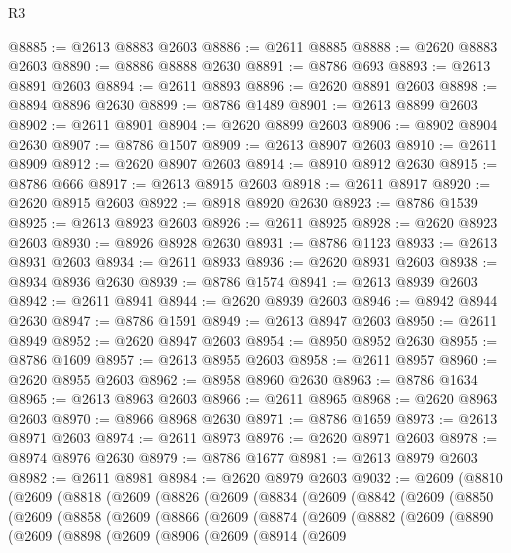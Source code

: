 \begin{lexlean}{R3}
\begin{coremodule}
@8885 := @2613 @8883 @2603
@8886 := @2611 @8885
@8888 := @2620 @8883 @2603
@8890 := @8886 @8888 @2630
@8891 := @8786 @693
@8893 := @2613 @8891 @2603
@8894 := @2611 @8893
@8896 := @2620 @8891 @2603
@8898 := @8894 @8896 @2630
@8899 := @8786 @1489
@8901 := @2613 @8899 @2603
@8902 := @2611 @8901
@8904 := @2620 @8899 @2603
@8906 := @8902 @8904 @2630
@8907 := @8786 @1507
@8909 := @2613 @8907 @2603
@8910 := @2611 @8909
@8912 := @2620 @8907 @2603
@8914 := @8910 @8912 @2630
@8915 := @8786 @666
@8917 := @2613 @8915 @2603
@8918 := @2611 @8917
@8920 := @2620 @8915 @2603
@8922 := @8918 @8920 @2630
@8923 := @8786 @1539
@8925 := @2613 @8923 @2603
@8926 := @2611 @8925
@8928 := @2620 @8923 @2603
@8930 := @8926 @8928 @2630
@8931 := @8786 @1123
@8933 := @2613 @8931 @2603
@8934 := @2611 @8933
@8936 := @2620 @8931 @2603
@8938 := @8934 @8936 @2630
@8939 := @8786 @1574
@8941 := @2613 @8939 @2603
@8942 := @2611 @8941
@8944 := @2620 @8939 @2603
@8946 := @8942 @8944 @2630
@8947 := @8786 @1591
@8949 := @2613 @8947 @2603
@8950 := @2611 @8949
@8952 := @2620 @8947 @2603
@8954 := @8950 @8952 @2630
@8955 := @8786 @1609
@8957 := @2613 @8955 @2603
@8958 := @2611 @8957
@8960 := @2620 @8955 @2603
@8962 := @8958 @8960 @2630
@8963 := @8786 @1634
@8965 := @2613 @8963 @2603
@8966 := @2611 @8965
@8968 := @2620 @8963 @2603
@8970 := @8966 @8968 @2630
@8971 := @8786 @1659
@8973 := @2613 @8971 @2603
@8974 := @2611 @8973
@8976 := @2620 @8971 @2603
@8978 := @8974 @8976 @2630
@8979 := @8786 @1677
@8981 := @2613 @8979 @2603
@8982 := @2611 @8981
@8984 := @2620 @8979 @2603
@9032 := @2609
    (@8810
      (@2609
        (@8818
          (@2609
            (@8826
              (@2609
                (@8834
                  (@2609
                    (@8842
                      (@2609
                        (@8850
                          (@2609
                            (@8858
                              (@2609
                                (@8866
                                  (@2609
                                    (@8874
                                      (@2609
                                        (@8882
                                          (@2609
                                            (@8890
                                              (@2609
                                                (@8898
                                                  (@2609
                                                    (@8906
                                                      (@2609
                                                        (@8914
                                                          (@2609

\end{coremodule}
\end{lexlean}
